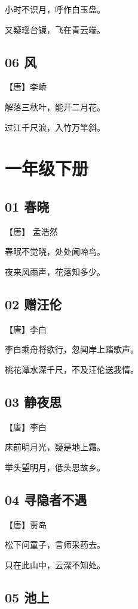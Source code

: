 \documentclass[12pt]{article}
\begin{document}
小时不识月，呼作白玉盘。

又疑瑶台镜，飞在青云端。

\subsection*{06 风}

【唐】李峤

解落三秋叶，能开二月花。

过江千尺浪，入竹万竿斜。

\newpage

\section*{一年级下册}

\subsection*{01 春晓}

【唐】 孟浩然

春眠不觉晓，处处闻啼鸟。

夜来风雨声，花落知多少。

\subsection*{02 赠汪伦}

【唐】李白

李白乘舟将欲行，忽闻岸上踏歌声。

桃花潭水深千尺，不及汪伦送我情。

\subsection*{03 静夜思}

【唐】李白

床前明月光，疑是地上霜。

举头望明月，低头思故乡。

\subsection*{04 寻隐者不遇}

【唐】贾岛 

松下问童子，言师采药去。

只在此山中，云深不知处。


\subsection*{05 池上}
\end{document}
